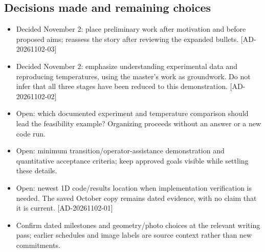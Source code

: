 \subsection{Decisions made and remaining choices}
\begin{itemize}[leftmargin=*]
\item Decided November 2: place preliminary work after motivation and before proposed aims; reassess the story after reviewing the expanded bullets. [AD-20261102-03]
\item Decided November 2: emphasize understanding experimental data and reproducing temperatures, using the master's work as groundwork. Do not infer that all three stages have been reduced to this demonstration. [AD-20261102-02]
\item Open: which documented experiment and temperature comparison should lead the feasibility example? Organizing proceeds without an answer or a new code run.
\item Open: minimum transition/operator-assistance demonstration and quantitative acceptance criteria; keep approved goals visible while settling these details.
\item Open: newest 1D code/results location when implementation verification is needed. The saved October copy remains dated evidence, with no claim that it is current. [AD-20261102-01]
\item Confirm dated milestones and geometry/photo choices at the relevant writing pass; earlier schedules and image labels are source context rather than new commitments.
\end{itemize}

